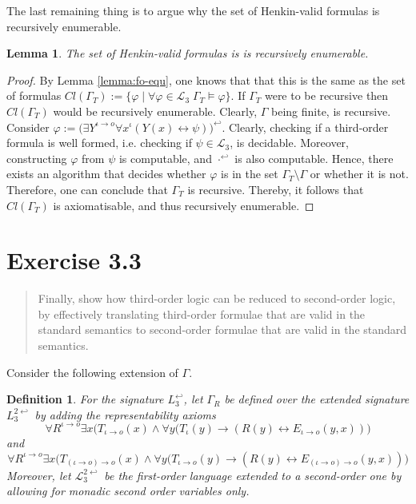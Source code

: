 \documentclass[11pt,a4paper]{article}
\newtheorem{lemma}[theorem]{Lemma}
\newtheorem{mydef}{Definition}
\newcommand{\tofo}{\hookleftarrow}
\newcommand{\of}{\iota }
\newcommand{\os}{\iota \to o}
\newcommand{\ot}{(\iota \to o)\to o}
\begin{document}
The last remaining thing is to argue why the set of Henkin-valid formulas is recursively enumerable. 

\begin{lemma}
The set of Henkin-valid formulas is is recursively enumerable.
\end{lemma}
\begin{proof}
By Lemma \ref{lemma:fo-equ}, one knows that that this is the same as the set of formulas $\mathit{Cl}(\Gamma_T):= \{\varphi\mid\forall \varphi \in \mathcal{L}_3\; \Gamma_T \models \varphi\}$. If $\Gamma_T$ were to be recursive then $\mathit{Cl}(\Gamma_T)$ would be recursively enumerable. Clearly, $\Gamma$ being finite, is recursive. Consider  $\varphi:=\big(\exists Y^{\os} \forall x^{\of} (Y(x) \leftrightarrow \psi)\big)^{\tofo}$. Clearly, checking if a third-order formula is well formed, i.e. checking if $\psi \in \mathcal{L}_3$, is decidable. Moreover, constructing $\varphi$ from $\psi$ is computable, and $\cdot^{\tofo}$ is also computable. Hence, there exists an algorithm that decides whether $\varphi$ is in the set $\Gamma_T \setminus \Gamma$ or whether it is not. Therefore, one can conclude that $\Gamma_T$ is recursive. Thereby, it follows that $\mathit{Cl}(\Gamma_T)$ is axiomatisable, and thus recursively enumerable.
\end{proof}

\section*{Exercise 3.3}
\begin{quote}
 Finally, show how third-order logic can be reduced to second-order logic, by effectively translating third-order formulae that are valid in the standard semantics to second-order formulae that are valid in the standard semantics.
\end{quote}



Consider the following extension of $\Gamma$.

\begin{mydef}
For the signature $L_3^{\tofo}$, let $\Gamma_R$ be defined over the extended signature $L_3^{2\tofo}$ by adding the representability axioms 
\begin{equation*}
\forall R^{\os} \exists x   \big( T_{\os}(x) \land  \forall y (T_{\of}(y)  \to (R(y) \leftrightarrow E_{\os}(y,x))\big)
\end{equation*}
and
\begin{equation*}
\forall R^{\os} \exists x   \big( T_{\ot}(x) \land  \forall y (T_{\os}(y)  \to (R(y) \leftrightarrow E_{\ot}(y,x))\big)
\end{equation*}
Moreover, let $\mathcal{L}_3^{2\tofo}$ be the first-order language extended to a second-order one by allowing for monadic second order variables only. 
\end{mydef}
\end{document}
